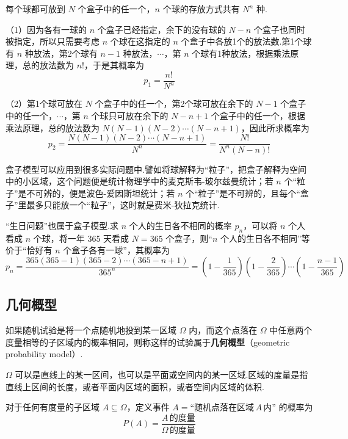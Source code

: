 \begin{solution}
    每个球都可放到 $N$ 个盒子中的任一个，$n$ 个球的存放方式共有 $N^n$ 种.

    （1）因为各有一球的 $n$ 个盒子已经指定，余下的没有球的 $N-n$ 个盒子也同时被指定，所以只需要考虑 $n$ 个球在这指定的 $n$ 个盒子中各放1个的放法数.第1个球有 $n$ 种放法，第2个球有 $n-1$ 种放法，$\cdots$，第 $n$ 个球有1种放法，根据乘法原理，总的放法数为 $n!$，于是其概率为
    $$
    p_1 = \dfrac{n!}{N^n}
    $$

    （2）第1个球可放在 $N$ 个盒子中的任一个，第2个球可放在余下的 $N-1$ 个盒子中的任一个，$\cdots$，第 $n$ 个球只可放在余下的 $N-n+1$ 个盒子中的任一个，根据乘法原理，总的放法数为 $N (N-1) (N-2) \cdots (N-n+1)$，因此所求概率为
    $$
    p_2 = \dfrac{N (N-1) (N-2) \cdots (N-n+1)}{N^n} = \dfrac{N!}{N^n (N-n)!}
    $$
\end{solution}

\begin{note}
    \indent 盒子模型可以应用到很多实际问题中.譬如将球解释为“粒子”，把盒子解释为空间中的小区域，这个问题便是统计物理学中的麦克斯韦-玻尔兹曼统计；若 $n$ 个“粒子”是不可辨的，便是波色-爱因斯坦统计；若 $n$ 个“粒子”是不可辨的，且每个“盒子”里最多只能放一个“粒子”，这时就是费米-狄拉克统计.

    “生日问题”也属于盒子模型.求 $n$ 个人的生日各不相同的概率 $p_n$，可以将 $n$ 个人看成 $n$ 个球，将一年 365 天看成 $N=365$ 个盒子，则“$n$ 个人的生日各不相同”等价于“恰好有 $n$ 个盒子各有一球”，其概率为
    $$
    p_n = \dfrac{365 (365-1) (365-2) \cdots (365-n+1)}{365^n} = \left( 1 - \dfrac{1}{365} \right) \left( 1 - \dfrac{2}{365} \right) \cdots \left( 1 - \dfrac{n-1}{365} \right)
    $$
\end{note}

\subsection{几何概型}

如果随机试验是将一个点随机地投到某一区域 $\varOmega$ 内，而这个点落在 $\varOmega$ 中任意两个度量相等的子区域内的概率相同，则称这样的试验属于\textbf{几何概型}（geometric probability model）.

\begin{note}
    \indent $\varOmega$ 可以是直线上的某一区间，也可以是平面或空间内的某一区域.区域的度量是指直线上区间的长度，或者平面内区域的面积，或者空间内区域的体积.
\end{note}

对于任何有度量的子区域 $A \subseteq \varOmega$，定义事件 $A = \text{“随机点落在区域}\, A \,\text{内”}$ 的概率为
$$
P(A)=\dfrac{A\,\text{的度量}}{\varOmega\,\text{的度量}}
$$

